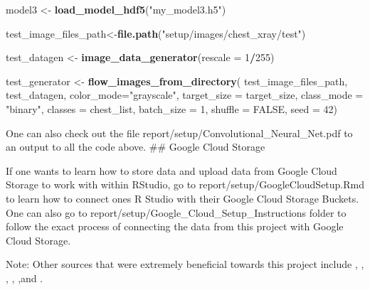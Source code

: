 \documentclass[12pt]{article}
\newenvironment{Shaded}{\begin{snugshade}}{\end{snugshade}}
\newcommand{\DataTypeTok}[1]{\textcolor[rgb]{0.13,0.29,0.53}{#1}}
\newcommand{\DecValTok}[1]{\textcolor[rgb]{0.00,0.00,0.81}{#1}}
\newcommand{\KeywordTok}[1]{\textcolor[rgb]{0.13,0.29,0.53}{\textbf{#1}}}
\newcommand{\NormalTok}[1]{#1}
\newcommand{\OperatorTok}[1]{\textcolor[rgb]{0.81,0.36,0.00}{\textbf{#1}}}
\newcommand{\OtherTok}[1]{\textcolor[rgb]{0.56,0.35,0.01}{#1}}
\newcommand{\StringTok}[1]{\textcolor[rgb]{0.31,0.60,0.02}{#1}}
\begin{document}
\begin{Shaded}
\begin{Highlighting}[]
\NormalTok{model3 <-}\StringTok{ }\KeywordTok{load_model_hdf5}\NormalTok{(}\StringTok{"my_model3.h5"}\NormalTok{)}

\NormalTok{test_image_files_path<-}\KeywordTok{file.path}\NormalTok{(}\StringTok{"setup/images/chest_xray/test"}\NormalTok{)}

\NormalTok{test_datagen <-}\StringTok{ }\KeywordTok{image_data_generator}\NormalTok{(}\DataTypeTok{rescale =} \DecValTok{1}\OperatorTok{/}\DecValTok{255}\NormalTok{)}

\NormalTok{test_generator <-}\StringTok{ }\KeywordTok{flow_images_from_directory}\NormalTok{(}
\NormalTok{        test_image_files_path,}
\NormalTok{        test_datagen,}
        \DataTypeTok{color_mode=}\StringTok{"grayscale"}\NormalTok{,}
        \DataTypeTok{target_size =}\NormalTok{ target_size,}
        \DataTypeTok{class_mode =} \StringTok{"binary"}\NormalTok{,}
        \DataTypeTok{classes =}\NormalTok{ chest_list,}
        \DataTypeTok{batch_size =} \DecValTok{1}\NormalTok{,}
        \DataTypeTok{shuffle =} \OtherTok{FALSE}\NormalTok{,}
        \DataTypeTok{seed =} \DecValTok{42}\NormalTok{)}
\end{Highlighting}
\end{Shaded}

\begin{Shaded}
\end{Shaded}

One can also check out the file
report/setup/Convolutional\_Neural\_Net.pdf to an output to all the code
above. \#\# Google Cloud Storage

If one wants to learn how to store data and upload data from Google
Cloud Storage to work with within RStudio, go to
report/setup/GoogleCloudSetup.Rmd to learn how to connect ones R Studio
with their Google Cloud Storage Buckets. One can also go to
report/setup/Google\_Cloud\_Setup\_Instructions folder to follow the
exact process of connecting the data from this project with Google Cloud
Storage.

Note: Other sources that were extremely beneficial towards this project
include \citep{PAD}, \citep{Medium}, \citep{CloudStorage},
\citep{Kaggle}, \citep{RPubs},and \citep{Shirin}. \newpage



\end{document}
